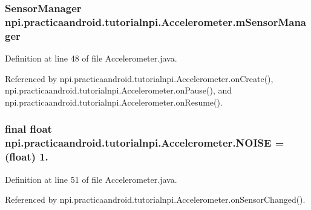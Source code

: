 \hypertarget{classnpi_1_1practicaandroid_1_1tutorialnpi_1_1_accelerometer_a3f322f5b38bcf2cdd0632a5761e8b561}{
\subsubsection[{m\-Sensor\-Manager}]{\setlength{\rightskip}{0pt plus 5cm}Sensor\-Manager npi.\-practicaandroid.\-tutorialnpi.\-Accelerometer.\-m\-Sensor\-Manager\hspace{0.3cm}{\ttfamily [private]}}}\label{classnpi_1_1practicaandroid_1_1tutorialnpi_1_1_accelerometer_a3f322f5b38bcf2cdd0632a5761e8b561}


Definition at line 48 of file Accelerometer.\-java.



Referenced by npi.\-practicaandroid.\-tutorialnpi.\-Accelerometer.\-on\-Create(), npi.\-practicaandroid.\-tutorialnpi.\-Accelerometer.\-on\-Pause(), and npi.\-practicaandroid.\-tutorialnpi.\-Accelerometer.\-on\-Resume().

\hypertarget{classnpi_1_1practicaandroid_1_1tutorialnpi_1_1_accelerometer_a1bfd98ab9d7bf8fc65bbd8454f7c7625}{
\subsubsection[{N\-O\-I\-S\-E}]{\setlength{\rightskip}{0pt plus 5cm}final float npi.\-practicaandroid.\-tutorialnpi.\-Accelerometer.\-N\-O\-I\-S\-E = (float) 1.\hspace{0.3cm}{\ttfamily [private]}}}\label{classnpi_1_1practicaandroid_1_1tutorialnpi_1_1_accelerometer_a1bfd98ab9d7bf8fc65bbd8454f7c7625}


Definition at line 51 of file Accelerometer.\-java.



Referenced by npi.\-practicaandroid.\-tutorialnpi.\-Accelerometer.\-on\-Sensor\-Changed().

